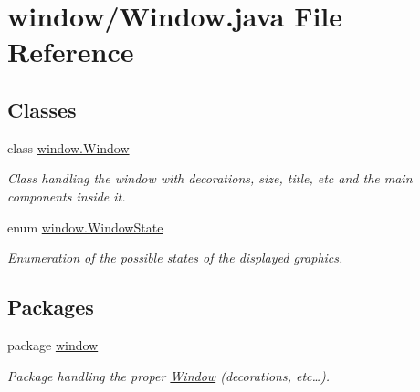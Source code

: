 \hypertarget{a00057}{\section{window/\-Window.java File Reference}
\label{a00057}
}
\subsection*{Classes}
\begin{DoxyCompactItemize}
\item 
class \hyperlink{a00037}{window.\-Window}
\begin{DoxyCompactList}\small\item\em Class handling the window with decorations, size, title, etc and the main components inside it. \end{DoxyCompactList}\item 
enum \hyperlink{a00038}{window.\-Window\-State}
\begin{DoxyCompactList}\small\item\em Enumeration of the possible states of the displayed graphics. \end{DoxyCompactList}\end{DoxyCompactItemize}
\subsection*{Packages}
\begin{DoxyCompactItemize}
\item 
package \hyperlink{a00086}{window}
\begin{DoxyCompactList}\small\item\em Package handling the proper \hyperlink{a00037}{Window} (decorations, etc…). \end{DoxyCompactList}\end{DoxyCompactItemize}
